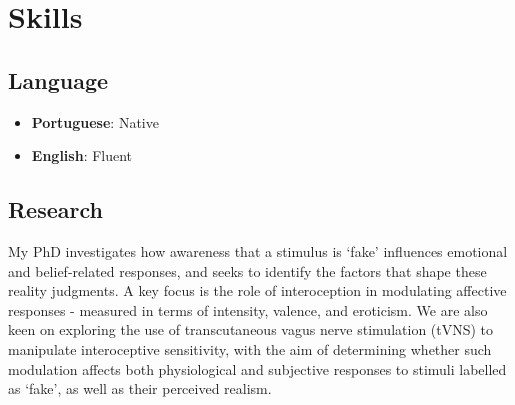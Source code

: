 \documentclass[11pt,a4paper,]{awesome-cv}
\providecommand{\tightlist}{%
	\setlength{\itemsep}{0pt}\setlength{\parskip}{0pt}}
\begin{document}
\begin{cventries}
\end{cventries}

\section{Skills}\label{skills}

\subsection{Language}\label{language}

\small

\begin{itemize}
\tightlist
\item
  \textbf{Portuguese}: Native
\item
  \textbf{English}: Fluent
\end{itemize}

\normalsize

\subsection{Research}\label{research}

\small

My PhD investigates how awareness that a stimulus is `fake' influences
emotional and belief-related responses, and seeks to identify the
factors that shape these reality judgments. A key focus is the role of
interoception in modulating affective responses - measured in terms of
intensity, valence, and eroticism. We are also keen on exploring the use
of transcutaneous vagus nerve stimulation (tVNS) to manipulate
interoceptive sensitivity, with the aim of determining whether such
modulation affects both physiological and subjective responses to
stimuli labelled as `fake', as well as their perceived realism.
\end{document}
